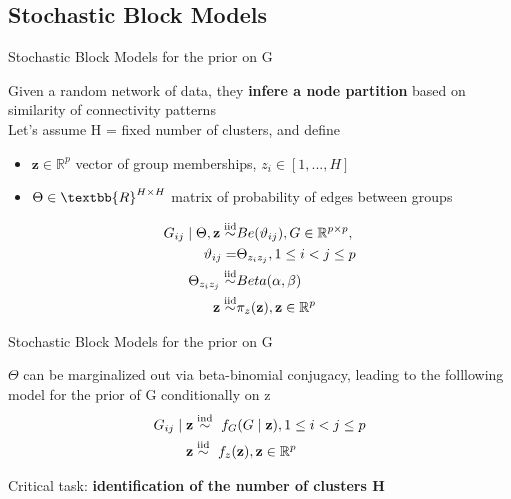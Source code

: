 \subsection{Stochastic Block Models}
\begin{frame}{Stochastic Block Models for the prior on G}

Given a random network of data, they \textbf{infere a node partition} based on similarity of connectivity patterns\\

Let's assume H = fixed number of clusters, and define 
\begin{itemize}
    \item $\mathbf{z} \in \mathbb{R}^p$ vector of group memberships, $z_{i} \in [1,...,H]$
    \item $\Theta \in \textbb{R}^{H\times H}$ matrix of probability of edges between groups
\end{itemize} 
\centering
\begin{align*}
    G_{ij} \mid \Theta,\mathbf{z} \overset{\mathrm{iid}}{\sim} & Be(\vartheta_{ij}),  G \in \mathbb{R}^{p \times p}, \\
    \vartheta_{ij} = &\Theta_{z_{i}z_{j}}, 1 \le i < j \le p \\ 
    \Theta_{z_{i}z_{j}} \overset{\mathrm{iid}}{\sim}& Beta(\alpha, \beta)\\
    \mathbf{z} \overset{\mathrm{iid}}{\sim} & \pi_{z}(\mathbf{z}), \mathbf{z} \in \mathbb{R}^p
\end{align*}


\end{frame}




\begin{frame}{Stochastic Block Models for the prior on G}

$\Theta$ can be marginalized out via beta-binomial conjugacy, leading to the folllowing model for the prior of G conditionally on z 
\centering
\begin{align*}
    G_{ij} \mid \mathbf{z} &\ind\  f_{G}(G \mid \mathbf{z}) , 1 \le i < j \le p \\ %
    \mathbf{z} &\iid\ f_{z}(\mathbf{z}), \mathbf{z} \in \mathbb{R}^p
  \end{align*}

 \large Critical task: \textbf{identification of the number of clusters H}

\end{frame}


